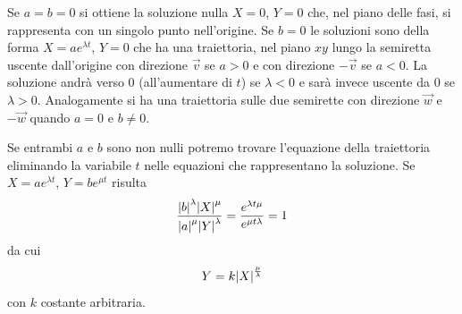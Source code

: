 Se $a=b=0$ si ottiene la soluzione nulla $X=0$, $Y=0$ che,
nel piano delle fasi, si rappresenta con un singolo punto
nell'origine. Se $b=0$ le soluzioni sono della forma
$X=a e^{\lambda t}$, $Y=0$ che ha una traiettoria,
nel piano $xy$ lungo la semiretta uscente dall'origine
con direzione $\vec v$
se $a>0$ e con direzione $-\vec v$ se $a<0$.
La soluzione andrà verso $0$ (all'aumentare di $t$)
se $\lambda<0$ e sarà invece uscente da $0$ se $\lambda >0$.
Analogamente si ha una traiettoria sulle due semirette
con direzione $\vec w$ e $-\vec w$ quando $a=0$ e $b\neq 0$.

Se entrambi $a$ e $b$ sono non nulli potremo trovare
l'equazione della traiettoria eliminando la variabile
$t$ nelle
equazioni che rappresentano la soluzione.
Se $X=a e^{\lambda t}$, $Y=b e^{\mu t}$ risulta
\[
  \frac{{\left|b\right|}^\lambda {\left|X\right|}^\mu}{{\left|a\right|}^\mu {\left|Y\right|}^\lambda}
  = \frac{e^{\lambda t \mu}}{e^{\mu t \lambda}} = 1
\]
da cui
\[
 Y = k {\left|X\right|}^{\frac \mu \lambda}
\]
con $k$ costante arbitraria.

